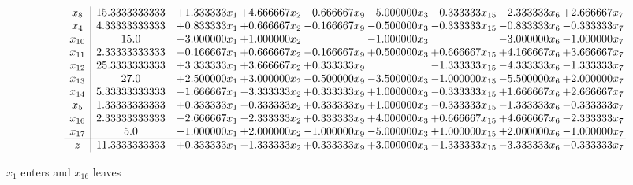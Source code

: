 \documentclass[10pt]{article}
\begin{document}
 \[\begin{array}{c| c c@{\hskip 2pt} c@{\hskip 2pt} c@{\hskip 2pt} c@{\hskip 2pt} c@{\hskip 2pt} c@{\hskip 2pt} c@{\hskip 2pt} }
 x_{8}   &  15.3333333333 & + 1.333333 x_{1} & + 4.666667 x_{2} & -0.666667 x_{9} & -5.000000 x_{3} & -0.333333 x_{15} & -2.333333 x_{6} & + 2.666667 x_{7}\\
 x_{4}   &  4.33333333333 & + 0.833333 x_{1} & + 0.666667 x_{2} & -0.166667 x_{9} & -0.500000 x_{3} & -0.333333 x_{15} & -0.833333 x_{6} & -0.333333 x_{7}\\
 x_{10}   &  15.0 & -3.000000 x_{1} & + 1.000000 x_{2} &   & -1.000000 x_{3} &   & -3.000000 x_{6} & -1.000000 x_{7}\\
 x_{11}   &  2.33333333333 & -0.166667 x_{1} & + 0.666667 x_{2} & -0.166667 x_{9} & + 0.500000 x_{3} & + 0.666667 x_{15} & + 4.166667 x_{6} & + 3.666667 x_{7}\\
 x_{12}   &  25.3333333333 & + 3.333333 x_{1} & + 3.666667 x_{2} & + 0.333333 x_{9} &   & -1.333333 x_{15} & -4.333333 x_{6} & -1.333333 x_{7}\\
 x_{13}   &  27.0 & + 2.500000 x_{1} & + 3.000000 x_{2} & -0.500000 x_{9} & -3.500000 x_{3} & -1.000000 x_{15} & -5.500000 x_{6} & + 2.000000 x_{7}\\
 x_{14}   &  5.33333333333 & -1.666667 x_{1} & -3.333333 x_{2} & + 0.333333 x_{9} & + 1.000000 x_{3} & -0.333333 x_{15} & + 1.666667 x_{6} & + 2.666667 x_{7}\\
 x_{5}   &  1.33333333333 & + 0.333333 x_{1} & -0.333333 x_{2} & + 0.333333 x_{9} & + 1.000000 x_{3} & -0.333333 x_{15} & -1.333333 x_{6} & -0.333333 x_{7}\\
 x_{16}   &  2.33333333333 & -2.666667 x_{1} & -2.333333 x_{2} & + 0.333333 x_{9} & + 4.000000 x_{3} & + 0.666667 x_{15} & + 4.666667 x_{6} & -2.333333 x_{7}\\
 x_{17}   &  5.0 & -1.000000 x_{1} & + 2.000000 x_{2} & -1.000000 x_{9} & -5.000000 x_{3} & + 1.000000 x_{15} & + 2.000000 x_{6} & -1.000000 x_{7}\\
\hline
z    &  11.3333333333 & + 0.333333 x_{1} & -1.333333 x_{2} & + 0.333333 x_{9} & + 3.000000 x_{3} & -1.333333 x_{15} & -3.333333 x_{6} & -0.333333 x_{7}\\
\end{array}\]


 $ x_{1} $ enters and $ x_{16} $ leaves 
\end{document}
